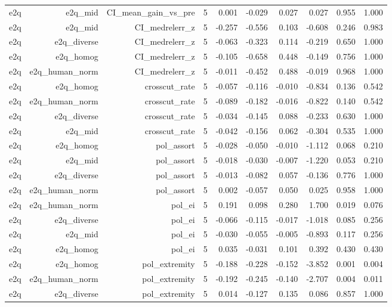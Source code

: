 \documentclass[11pt]{article}
\begin{document}
\begin{landscape}
\begin{longtable}{@{}lrrrrrrrrr@{}}
e2q & e2q\_mid & CI\_mean\_gain\_vs\_pre & 5 & 0.001 & -0.029 & 0.027 & 0.027 & 0.955 & 1.000 \\
e2q & e2q\_mid & CI\_medrelerr\_z & 5 & -0.257 & -0.556 & 0.103 & -0.608 & 0.246 & 0.983 \\
e2q & e2q\_diverse & CI\_medrelerr\_z & 5 & -0.063 & -0.323 & 0.114 & -0.219 & 0.650 & 1.000 \\
e2q & e2q\_homog & CI\_medrelerr\_z & 5 & -0.105 & -0.658 & 0.448 & -0.149 & 0.756 & 1.000 \\
e2q & e2q\_human\_norm & CI\_medrelerr\_z & 5 & -0.011 & -0.452 & 0.488 & -0.019 & 0.968 & 1.000 \\
e2q & e2q\_homog & crosscut\_rate & 5 & -0.057 & -0.116 & -0.010 & -0.834 & 0.136 & 0.542 \\
e2q & e2q\_human\_norm & crosscut\_rate & 5 & -0.089 & -0.182 & -0.016 & -0.822 & 0.140 & 0.542 \\
e2q & e2q\_diverse & crosscut\_rate & 5 & -0.034 & -0.145 & 0.088 & -0.233 & 0.630 & 1.000 \\
e2q & e2q\_mid & crosscut\_rate & 5 & -0.042 & -0.156 & 0.062 & -0.304 & 0.535 & 1.000 \\
e2q & e2q\_homog & pol\_assort & 5 & -0.028 & -0.050 & -0.010 & -1.112 & 0.068 & 0.210 \\
e2q & e2q\_mid & pol\_assort & 5 & -0.018 & -0.030 & -0.007 & -1.220 & 0.053 & 0.210 \\
e2q & e2q\_diverse & pol\_assort & 5 & -0.013 & -0.082 & 0.057 & -0.136 & 0.776 & 1.000 \\
e2q & e2q\_human\_norm & pol\_assort & 5 & 0.002 & -0.057 & 0.050 & 0.025 & 0.958 & 1.000 \\
e2q & e2q\_human\_norm & pol\_ei & 5 & 0.191 & 0.098 & 0.280 & 1.700 & 0.019 & 0.076 \\
e2q & e2q\_diverse & pol\_ei & 5 & -0.066 & -0.115 & -0.017 & -1.018 & 0.085 & 0.256 \\
e2q & e2q\_mid & pol\_ei & 5 & -0.030 & -0.055 & -0.005 & -0.893 & 0.117 & 0.256 \\
e2q & e2q\_homog & pol\_ei & 5 & 0.035 & -0.031 & 0.101 & 0.392 & 0.430 & 0.430 \\
e2q & e2q\_homog & pol\_extremity & 5 & -0.188 & -0.228 & -0.152 & -3.852 & 0.001 & 0.004 \\
e2q & e2q\_human\_norm & pol\_extremity & 5 & -0.192 & -0.245 & -0.140 & -2.707 & 0.004 & 0.011 \\
e2q & e2q\_diverse & pol\_extremity & 5 & 0.014 & -0.127 & 0.135 & 0.086 & 0.857 & 1.000 \\

\end{longtable}
\end{landscape}
\end{document}
